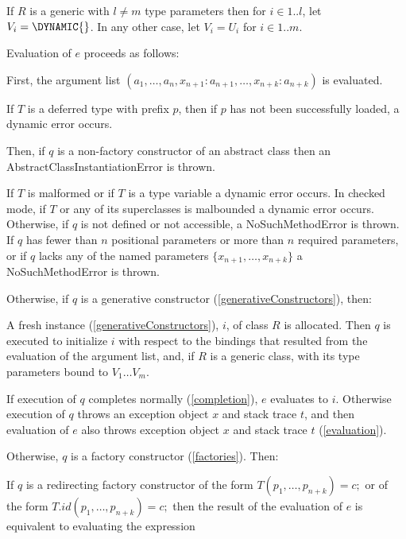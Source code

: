 \documentclass{article}
\newcommand{\code}[1]{{\sf #1}}
\begin{document}
\LMHash{}
If $R$ is a generic with $l \ne m$ type parameters then for $ i \in 1 .. l$, let $V_i =  \DYNAMIC{}$. In any other case, let $V_i = U_i$ for $ i \in 1 .. m$.

\LMHash{}
Evaluation of $e$ proceeds as follows:

\LMHash{}
First, the argument list $(a_1, \ldots , a_n, x_{n+1}: a_{n+1}, \ldots , x_{n+k}: a_{n+k})$ is evaluated.

\LMHash{}
If $T$ is a deferred type with prefix $p$, then if $p$ has not been successfully loaded, a dynamic error occurs.

\LMHash{}
Then, if $q$ is a non-factory constructor of an abstract class then an \code{AbstractClassInstantiationError} is thrown.

\LMHash{}
If $T$ is malformed or if $T$ is a type variable a dynamic error occurs.
In checked mode, if $T$ or any of its superclasses is malbounded a dynamic error occurs.
Otherwise, if $q$ is not defined or not accessible, a \code{NoSuchMethodError} is thrown.
If $q$ has fewer than $n$ positional parameters or more than $n$ required parameters,
or if $q$ lacks any of the named parameters $\{ x_{n+1}, \ldots, x_{n+k}\}$ a \code{NoSuchMethodError} is thrown.

\LMHash{}
Otherwise, if $q$ is a generative constructor (\ref{generativeConstructors}), then:


\LMHash{}
A fresh instance (\ref{generativeConstructors}), $i$, of class $R$ is allocated.
Then $q$ is executed to initialize $i$ with respect to the bindings that resulted from the evaluation of the argument list, and, if $R$ is a generic class, with its type parameters bound to $V_1 \ldots V_m$.

If execution of $q$ completes normally (\ref{completion}), $e$ evaluates to $i$.
Otherwise execution of $q$ throws an exception object $x$ and stack trace $t$,
and then evaluation of $e$ also throws exception object $x$ and stack trace $t$
(\ref{evaluation}).

\LMHash{}
Otherwise, $q$ is a factory constructor (\ref{factories}). Then:

\LMHash{}
If $q$ is a redirecting factory constructor of the form $T(p_1, \ldots, p_{n+k}) = c;$ or of the form  $T.id(p_1, \ldots, p_{n+k}) = c;$ then the result of the evaluation of $e$ is equivalent to evaluating the expression
\end{document}
